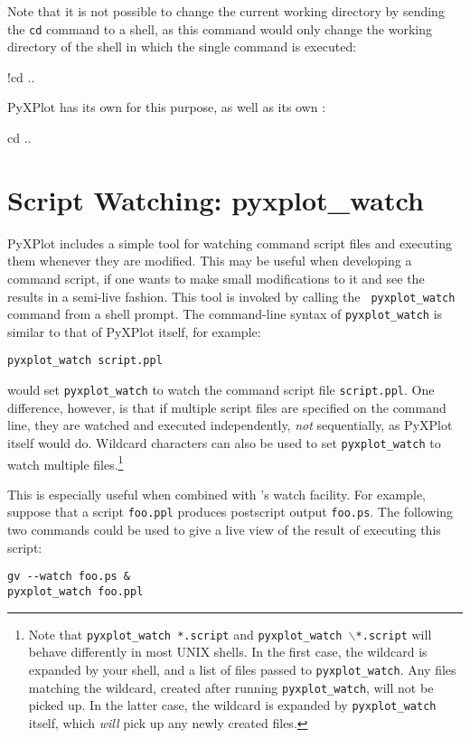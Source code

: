 Note that it is not possible to change the current working directory by sending
the {\tt cd} command to a shell, as this command would only change the working
directory of the shell in which the single command is executed:

\begin{dontdo}
!cd ..
\end{dontdo}

PyXPlot has its own  for this purpose, as well as its own
:

\begin{dodo}
cd ..
\end{dodo}

\section{Script Watching: pyxplot\_watch}

PyXPlot includes a simple tool for watching command script files and executing
them whenever they are modified. This may be useful when developing a command
script, if one wants to make small modifications to it and see the results in a
semi-live fashion. This tool is invoked by calling the {\tt
pyxplot\_watch} command from a
shell prompt. The command-line syntax of {\tt pyxplot\_watch} is similar to
that of PyXPlot itself, for example:

\begin{verbatim}
pyxplot_watch script.ppl
\end{verbatim}

\noindent would set {\tt pyxplot\_watch} to watch the command script file
{\tt script.ppl}. One difference, however, is that if multiple script files are
specified on the command line, they are watched and executed independently,
\textit{not} sequentially, as PyXPlot itself would do. Wildcard characters can
also be used to set {\tt pyxplot\_watch} to watch multiple
files.\footnote{Note that {\tt pyxplot\_watch *.script} and
{\tt pyxplot\_watch $\backslash$*.script} will behave differently in most
UNIX shells.  In the first case, the wildcard is expanded by your shell, and a
list of files passed to {\tt pyxplot\_watch}. Any files matching the
wildcard, created after running {\tt pyxplot\_watch}, will not be picked up.
In the latter case, the wildcard is expanded by {\tt pyxplot\_watch} itself,
which {\it will} pick up any newly created files.}

This is especially useful when combined with \ghostview's
watch facility. For example, suppose that a script {\tt foo.ppl} produces
postscript output {\tt foo.ps}. The following two commands could be used to
give a live view of the result of executing this script:

\begin{verbatim}
gv --watch foo.ps &
pyxplot_watch foo.ppl
\end{verbatim}

